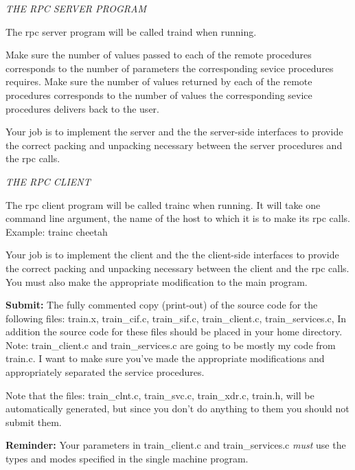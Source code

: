 \vfill\eject

{\it THE RPC SERVER PROGRAM}

The rpc server program will be called {\ltt{}traind} when running.

Make sure the number of values passed to each of the remote procedures
corresponds to the number of parameters the corresponding
sevice procedures requires.
Make sure the number of values returned by each of the remote procedures
corresponds to the number of values the corresponding
sevice procedures delivers back to the user.

Your job is to implement the server and the
the server-side interfaces to provide the correct packing and unpacking
necessary between the server procedures and the rpc calls.

{\it THE RPC CLIENT}

The rpc client program will be called {\ltt{}trainc} when running.
It will take one command line argument, the name of the host to which 
it is to make its rpc calls.
Example: {\ltt{}trainc cheetah}

Your job is to implement the client and the
the client-side interfaces to provide the correct packing and unpacking
necessary between the client and the rpc calls.
You must also make the appropriate modification to the main program.

{\bf Submit:} The fully commented copy (print-out) of the source code
for the following files:
{\ltt{}train.x},
{\ltt{}train_cif.c},
{\ltt{}train_sif.c},
{\ltt{}train_client.c},
{\ltt{}train_services.c},
In addition the source code for these files should be placed in your home
directory.
Note: {\ltt{}train_client.c} and {\ltt{}train_services.c} are going 
to be mostly my code from {\ltt{}train.c}. 
I want to make sure you've made the appropriate modifications
and appropriately separated the service procedures.

Note that the files:
{\ltt{}train_clnt.c},
{\ltt{}train_svc.c},
{\ltt{}train_xdr.c},
{\ltt{}train.h},
will be automatically generated, but since you don't do anything to them
you should not submit them.

\bigskip
{\bf Reminder:}
Your parameters in 
{\ltt{}train_client.c} and
{\ltt{}train_services.c} {\it must}
use the types and modes specified in the single machine program.

\bye

